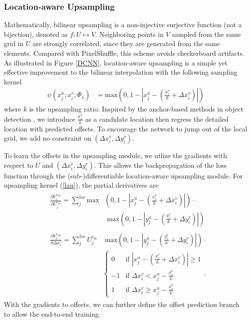 \documentclass[10pt,twocolumn,letterpaper]{article}
\begin{document}
\subsubsection{Location-aware Upsampling}
Mathematically, bilinear upsampling is a non-injective surjective function (not a bijection), denoted as $f:U\mapsto V$. Neighboring points in $V$ sampled from the same grid in $U$ are strongly correlated, since they are generated from the same elements. Compared with PixelShuffle, this scheme avoids checkerboard artifacts. As illustrated in Figure \ref{DCNN}, location-aware upsampling is a simple yet effective improvement to the bilinear interpolation with the following sampling kernel
\begin{align}
\psi(x_j^u;x_i^v;\Phi_x)&=\text{max}(0,1-|x_j^u-(\frac{x_i^v}{k}+\Delta x_i^v)|)
\label{lau}
\end{align}
where $k$ is the upsampling ratio. Inspired by the anchor-based methods in object detection \cite{Girshick15, RenHGS15}, we introduce $\frac{x_i^v}{k}$ as a candidate location then regress the detailed location with predicted offsets. To encourage the network to jump out of the local grid, we add no constraint on $(\Delta x_i^v, \Delta y_i^v)$. 

To learn the offsets in the upsampling module, we utlize the gradients with respect to $U$ and $(\Delta x_i^v,\Delta y_i^v)$. This allows the backpropagation of the loss function through the (sub-)differentiable location-aware upsampling module. For upsampling kernel (\ref{lau}), the partial derivatives are
\begin{align*}
&\begin{aligned}
\frac{\partial V_i^{c_{\text{out}}}}{\partial U_j^{c_{\text{in}}}}=\sum_j^{hw}\text{max}&(0,1-|x_j^u-(\frac{x_i^v}{k}+\Delta x_i^v)|)\cdot\\&\text{ max}(0,1-|y_j^u-(\frac{y_i^v}{k}+\Delta y_i^v)|)
\end{aligned}\\
&\begin{aligned}
\frac{\partial V_i^{c_{\text{out}}}}{\partial \Delta x_i^v}=\sum_j^{hw}U_j^{c_{\text{in}}}&\text{ max}(0,1-|y_j^u-(\frac{y_i^v}{k}+\Delta y_i^v)|)\cdot\\
&\begin{cases}
0 &\text{if  } |x_j^u-(\frac{x_i^v}{k}+\Delta x_i^v)|\geq1\\
-1 &\text{if  } \Delta x_i^v< x_j^u-\frac{x_i^v}{k}  \\
1 &\text{if  } \Delta x_i^v\geq x_j^u-\frac{x_i^v}{k}
\end{cases}.
\label{eq:5}
\end{aligned}
\end{align*}
With the gradients to offsets, we can further define the offset prediction branch to allow the end-to-end training.
\end{document}
